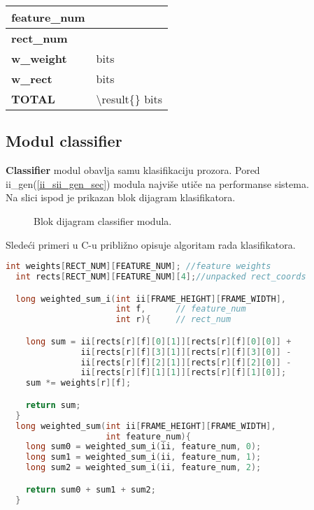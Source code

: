 \begin{center}
  \centering
   \label{feature_mem_size}
    \begin{tabular}{| P{3.0cm} | P{3.0cm}|}
    \hline
     \textbf{feature\_num} & \featureNum{}  \\ \hline
     \textbf{rect\_num} & \rectNum{}  \\ \hline
     \textbf{w\_weight} & \wWeight{} bits  \\ \hline
     \textbf{w\_rect} & \wRect{} bits  \\ \hline
       \textbf{TOTAL} &  \num[group-separator={,}]{\result{}} bits \\ \hline
    \end{tabular}
\end{center}

\newpage

\subsection{Modul classifier}

\textbf{Classifier} modul obavlja samu klasifikaciju prozora.
Pored ii\_gen(\ref{ii_sii_gen_sec}) modula najviše utiče na performanse sistema. \\

Na slici ispod je prikazan blok dijagram klasifikatora.\\

\begin{figure}[H]
  \centering
  \resizebox{0.9\textwidth}{!}{%
    
    }
\caption{Blok dijagram classifier modula.}
\label{classifier_bd}
\end{figure}

\newpage

Sledeći primeri u C-u približno opisuje algoritam rada klasifikatora.

\begin{lstlisting}[language=C++,caption={Weighted\_sum u \textbf{C}-u},captionpos=b, label=weighted_sum_code]
  int weights[RECT_NUM][FEATURE_NUM]; //feature weights
  int rects[RECT_NUM][FEATURE_NUM][4];//unpacked rect_coords

  long weighted_sum_i(int ii[FRAME_HEIGHT][FRAME_WIDTH],
                      int f,      // feature_num
                      int r){     // rect_num

    long sum = ii[rects[r][f][0][1]][rects[r][f][0][0]] +
               ii[rects[r][f][3][1]][rects[r][f][3][0]] -
               ii[rects[r][f][2][1]][rects[r][f][2][0]] -
               ii[rects[r][f][1][1]][rects[r][f][1][0]];
    sum *= weights[r][f];

    return sum;
  }
  long weighted_sum(int ii[FRAME_HEIGHT][FRAME_WIDTH],
                    int feature_num){
    long sum0 = weighted_sum_i(ii, feature_num, 0);
    long sum1 = weighted_sum_i(ii, feature_num, 1);
    long sum2 = weighted_sum_i(ii, feature_num, 2);

    return sum0 + sum1 + sum2;
  }
\end{lstlisting}

